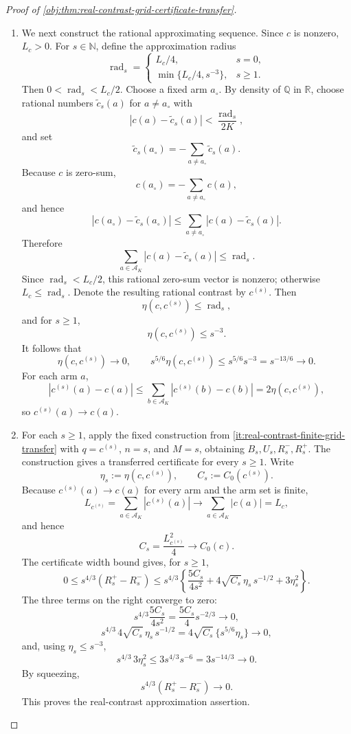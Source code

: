 \documentclass[11pt]{article}
\begin{document}
\begin{proof}[Proof of \cref{obj:thm:real-contrast-grid-certificate-transfer}]
\begin{enumerate}
\item We next construct the rational approximating sequence.  Since \(c\) is nonzero, \(L_c>0\).  For \(s\in\mathbb N\), define the approximation radius
\[
\operatorname{rad}_s=
\begin{cases}
L_c/4,& s=0,\\
\min\{L_c/4,s^{-3}\},& s\ge1 .
\end{cases}
\]
Then \(0<\operatorname{rad}_s<L_c/2\).  Choose a fixed arm \(a_\circ\).  By density of \(\mathbb Q\) in \(\mathbb R\), choose rational numbers \(\widetilde c_s(a)\) for \(a\ne a_\circ\) with
\[
|c(a)-\widetilde c_s(a)|<\frac{\operatorname{rad}_s}{2K},
\]
and set
\[
\widetilde c_s(a_\circ)
=
-\sum_{a\ne a_\circ}\widetilde c_s(a).
\]
Because \(c\) is zero-sum,
\[
c(a_\circ)=-\sum_{a\ne a_\circ}c(a),
\]
and hence
\[
|c(a_\circ)-\widetilde c_s(a_\circ)|
\le
\sum_{a\ne a_\circ}|c(a)-\widetilde c_s(a)|.
\]
Therefore
\[
\sum_{a\in\mathcal A_K}|c(a)-\widetilde c_s(a)|
\le \operatorname{rad}_s .
\]
Since \(\operatorname{rad}_s<L_c/2\), this rational zero-sum vector is nonzero; otherwise \(L_c\le\operatorname{rad}_s\).  Denote the resulting rational contrast by \(c^{(s)}\).  Then
\[
\eta(c,c^{(s)})\le \operatorname{rad}_s,
\]
and for \(s\ge1\),
\[
\eta(c,c^{(s)})\le s^{-3}.
\]
It follows that
\[
\eta(c,c^{(s)})\to0,
\qquad
s^{5/6}\eta(c,c^{(s)})
\le s^{5/6}s^{-3}=s^{-13/6}\to0 .
\]
For each arm \(a\),
\[
|c^{(s)}(a)-c(a)|
\le
\sum_{b\in\mathcal A_K}|c^{(s)}(b)-c(b)|
=
2\eta(c,c^{(s)}),
\]
so \(c^{(s)}(a)\to c(a)\). %

\item For each \(s\ge1\), apply the fixed construction from \cref{it:real-contrast-finite-grid-transfer} with \(q=c^{(s)}\), \(n=s\), and \(M=s\), obtaining \(B_s,U_s,R_s^-,R_s^+\).  The construction gives a transferred certificate for every \(s\ge1\).  Write
\[
\eta_s:=\eta(c,c^{(s)}),
\qquad
C_s:=C_0(c^{(s)}).
\]
Because \(c^{(s)}(a)\to c(a)\) for every arm and the arm set is finite,
\[
L_{c^{(s)}}=\sum_{a\in\mathcal A_K}|c^{(s)}(a)|
\longrightarrow
\sum_{a\in\mathcal A_K}|c(a)|=L_c,
\]
and hence
\[
C_s=\frac{L_{c^{(s)}}^2}{4}\longrightarrow C_0(c).
\]
The certificate width bound gives, for \(s\ge1\),
\[
0\le s^{4/3}(R_s^+-R_s^-)
\le
s^{4/3}\left\{
\frac{5C_s}{4s^2}
+4\sqrt{C_s}\,\eta_s\,s^{-1/2}
+3\eta_s^2
\right\}.
\]
The three terms on the right converge to zero:
\[
s^{4/3}\frac{5C_s}{4s^2}
=
\frac{5C_s}{4}s^{-2/3}\to0,
\]
\[
s^{4/3}\,4\sqrt{C_s}\,\eta_s\,s^{-1/2}
=
4\sqrt{C_s}\,\{s^{5/6}\eta_s\}\to0,
\]
and, using \(\eta_s\le s^{-3}\),
\[
s^{4/3}\,3\eta_s^2
\le
3s^{4/3}s^{-6}
=
3s^{-14/3}\to0.
\]
By squeezing,
\[
s^{4/3}(R_s^+-R_s^-)\to0.
\]
This proves the real-contrast approximation assertion. %


\end{enumerate}
\end{proof}
\end{document}
